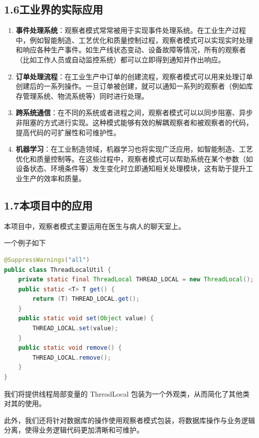 \documentclass[24pt,a4paper]{article}%
\begin{document}
\subsection*{\songti 1.6工业界的实际应用}
\begin{enumerate}
    \item \textbf{事件处理系统}：观察者模式常常被用于实现事件处理系统。在工业生产过程中，例如智能制造、工艺优化和质量控制过程，观察者模式可以实现实时处理和响应各种生产事件。如生产线状态变动、设备故障等情况，所有的观察者（比如工作人员或自动监控系统）都可以立即得到通知并作出响应。
    \item \textbf{订单处理流程}：在工业生产中订单的创建流程，观察者模式可以用来处理订单创建后的一系列操作。一旦订单被创建，就可以通知一系列的观察者（例如库存管理系统、物流系统等）同时进行处理。
    \item \textbf{跨系统通信}：在不同的系统或者进程之间，观察者模式可以以同步阻塞、异步非阻塞的方式进行实现。这种模式能够有效的解耦观察者和被观察者的代码，提高代码的可扩展性和可维护性。
    \item \textbf{机器学习}：在工业制造领域，机器学习也将实现广泛应用，如智能制造、工艺优化和质量控制等。在这些过程中，观察者模式可以帮助系统在某个参数（如设备状态、环境条件等）发生变化时立即通知相关处理模块，这有助于提升工业生产的效率和质量。
\end{enumerate}

\subsection*{\songti 1.7本项目中的应用}
本项目中，观察者模式主要运用在医生与病人的聊天室上。

一个例子如下
\begin{lstlisting}[language=Java]
@SuppressWarnings("all")
public class ThreadLocalUtil {
    private static final ThreadLocal THREAD_LOCAL = new ThreadLocal();
    public static <T> T get() {
        return (T) THREAD_LOCAL.get();
    }
    public static void set(Object value) {
        THREAD_LOCAL.set(value);
    }
    public static void remove() {
        THREAD_LOCAL.remove();
    }
}
\end{lstlisting}
我们将提供线程局部变量的 ThreadLocal 包装为一个外观类，从而简化了其他类对其的使用。

此外，我们还将针对数据库的操作使用观察者模式包装，将数据库操作与业务逻辑分离，使得业务逻辑代码更加清晰和可维护。
\end{document}
